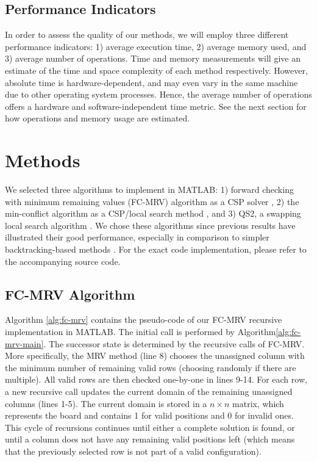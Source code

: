 \subsection{Performance Indicators}

In order to assess the quality of our methods, we will employ three different performance indicators: 1) average execution time, 2) average memory used, and 3) average number of operations. Time and memory measurements will give an estimate of the time and space complexity of each method respectively. However, absolute time is hardware-dependent, and may even vary in the same machine due to other operating system processes. Hence, the average number of operations offers a hardware and software-independent time metric. See the next section for how operations and memory usage are estimated.


\section{Methods}
\label{sec:methods}

We selected three algorithms to implement in MATLAB: 1) forward checking with minimum remaining values (FC-MRV) algorithm as a CSP solver \citep{aima}, 2) the min-conflict algorithm as a CSP/local search method  \citep{aima}, and 3) QS2, a swapping local search algorithm \citep{sosic91}. We chose these algorithms since previous results have illustrated their good performance, especially in comparison to simpler backtracking-based methods \citep{aima, sosic91}. For the exact code implementation, please refer to the accompanying source code.

\subsection{FC-MRV Algorithm}

Algorithm \ref{alg:fc-mrv} contains the pseudo-code of our FC-MRV recursive implementation in MATLAB. The initial call is performed by Algorithm\ref{alg:fc-mrv-main}. The successor state is determined by the recursive calls of FC-MRV. More specifically, the MRV method (line 8) chooses the unassigned column with the minimum number of remaining valid rows (choosing randomly if there are multiple). All valid rows are then checked one-by-one in lines 9-14. For each row, a new recursive call updates the current domain of the remaining unassigned columns (lines 1-5). The current domain is stored in a $n\times n$ matrix, which represents the board and contains 1 for valid positions and 0 for invalid ones. This cycle of recursions continues until either a complete solution is found, or until a column does not have any remaining valid positions left (which means that the previously selected row is not part of a valid configuration).

